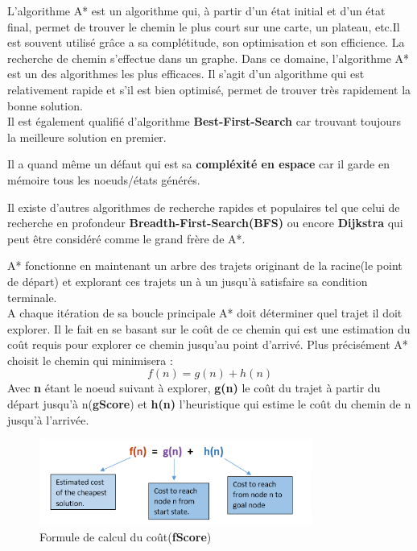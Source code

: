 \documentclass[12pt]{article}
\begin{document}
    L'algorithme A*\cite{WikiAstar} est un algorithme qui, à partir d'un état initial et d'un état final, permet de trouver le chemin le 
	plus court sur une carte, un plateau, etc.Il est souvent utilisé grâce a sa complétitude, son optimisation et 
	son efficience.
	La recherche de chemin s'effectue dans un graphe. Dans ce domaine, l'algorithme A* est 
	un des algorithmes les plus efficaces. Il s'agit d'un algorithme qui est relativement rapide et s'il est bien optimisé, permet de 
	trouver très rapidement la bonne solution. \\
	Il est également qualifié d'algorithme \textbf{Best-First-Search} car trouvant toujours la meilleure solution en premier.

	Il a quand même un défaut qui est sa \textbf{compléxité en espace} car il garde en mémoire tous les noeuds/états générés.

	Il existe d'autres algorithmes de recherche rapides et populaires tel que celui de recherche en profondeur \textbf{Breadth-First-Search(BFS)} \cite{WikiBFS}
	ou encore \textbf{Dijkstra} \cite{WikiDijkstra} qui peut être considéré comme le grand frère de A*.
    
	A* fonctionne en maintenant un arbre des trajets originant de la racine(le point de départ) et explorant ces trajets un à un jusqu'à
	satisfaire sa condition terminale.\\
	A chaque itération de sa boucle principale A* doit déterminer quel trajet il doit explorer. Il le fait en se basant sur le coût 
	de ce chemin qui est une estimation du coût requis pour explorer ce chemin jusqu'au point d'arrivé. Plus précisément A* choisit le 
	chemin qui minimisera :
	\begin{equation}
		f(n) = g(n) + h(n)
	\end{equation}
	Avec \textbf{n} étant le noeud suivant à explorer, \textbf{g(n)} le coût du trajet  à partir du départ jusqu'à n(\textbf{gScore}) et \textbf{h(n)} l'heuristique qui estime
	le coût du chemin de n jusqu'à l'arrivée.\\
	
	\begin{figure}[h!]
		\centering
		\includegraphics[width = 0.8\textwidth]{Images/fn.png}
		\caption{Formule de calcul du coût(\textbf{fScore})}
		\label{eq1}
	\end{figure}
\end{document}
